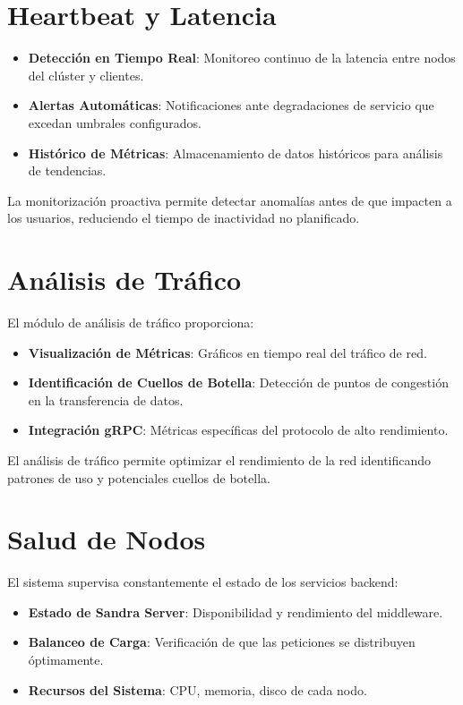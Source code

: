 \section{Heartbeat y Latencia}

\begin{itemize}
\item \textbf{Detección en Tiempo Real}: Monitoreo continuo de la latencia entre nodos del clúster y clientes.
\item \textbf{Alertas Automáticas}: Notificaciones ante degradaciones de servicio que excedan umbrales configurados.
\item \textbf{Histórico de Métricas}: Almacenamiento de datos históricos para análisis de tendencias.
\end{itemize}

La monitorización proactiva permite detectar anomalías antes de que impacten a los usuarios, reduciendo el tiempo de inactividad no planificado.

\section{Análisis de Tráfico}

El módulo de análisis de tráfico proporciona:

\begin{itemize}
\item \textbf{Visualización de Métricas}: Gráficos en tiempo real del tráfico de red.
\item \textbf{Identificación de Cuellos de Botella}: Detección de puntos de congestión en la transferencia de datos.
\item \textbf{Integración gRPC}: Métricas específicas del protocolo de alto rendimiento.
\end{itemize}

El análisis de tráfico permite optimizar el rendimiento de la red identificando patrones de uso y potenciales cuellos de botella.

\section{Salud de Nodos}

El sistema supervisa constantemente el estado de los servicios backend:

\begin{itemize}
\item \textbf{Estado de Sandra Server}: Disponibilidad y rendimiento del middleware.
\item \textbf{Balanceo de Carga}: Verificación de que las peticiones se distribuyen óptimamente.
\item \textbf{Recursos del Sistema}: CPU, memoria, disco de cada nodo.
\end{itemize}

